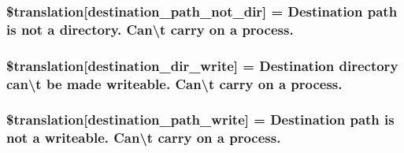 \subsubsection[{\$translation}]{\setlength{\rightskip}{0pt plus 5cm}\$translation\mbox{[}\textquotesingle{}destination\+\_\+path\+\_\+not\+\_\+dir\textquotesingle{}\mbox{]} = \textquotesingle{}Destination path is not a directory. Can\textbackslash{}\textquotesingle{}t carry on a process.\textquotesingle{}}\label{class_8upload_8xx___x_x_8php_a5704a67137126e8c87b7a364175929d4}
\hypertarget{class_8upload_8xx___x_x_8php_a97608ea194a616db49141a0e6dee900c}{}
\subsubsection[{\$translation}]{\setlength{\rightskip}{0pt plus 5cm}\$translation\mbox{[}\textquotesingle{}destination\+\_\+dir\+\_\+write\textquotesingle{}\mbox{]} = \textquotesingle{}Destination directory can\textbackslash{}\textquotesingle{}t be made writeable. Can\textbackslash{}\textquotesingle{}t carry on a process.\textquotesingle{}}\label{class_8upload_8xx___x_x_8php_a97608ea194a616db49141a0e6dee900c}
\hypertarget{class_8upload_8xx___x_x_8php_a40e4e1962226b89fd76da5819a9602b0}{}
\subsubsection[{\$translation}]{\setlength{\rightskip}{0pt plus 5cm}\$translation\mbox{[}\textquotesingle{}destination\+\_\+path\+\_\+write\textquotesingle{}\mbox{]} = \textquotesingle{}Destination path is not a writeable. Can\textbackslash{}\textquotesingle{}t carry on a process.\textquotesingle{}}\label{class_8upload_8xx___x_x_8php_a40e4e1962226b89fd76da5819a9602b0}
\hypertarget{class_8upload_8xx___x_x_8php_a2baece8da11e20d45175db91851ec3e3}{}
